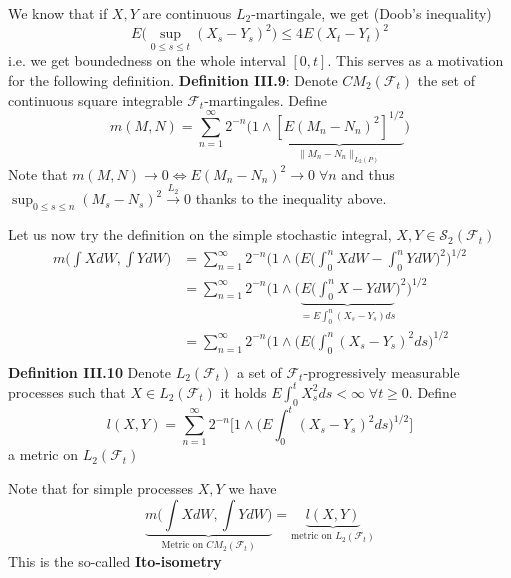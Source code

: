 \documentclass[english]{article}
\newcommand{\ub}{\underbrace}
\newcommand{\note}[1]{\noindent\textbf{#1}}
\newcommand{\F}{\mathcal F}
\begin{document}
We know that if $X,Y$ are continuous $L_2$-martingale, we get (Doob's inequality)
$$E\Big(\sup_{0\leq s \leq t} (X_s - Y_s)^2 \Big) \leq 4 E(X_t - Y_t)^2$$
i.e. we get boundedness on the whole interval $[0,t]$. This serves as a motivation for the following definition. \newline
\note{Definition III.9}: Denote $CM_2(\F_t)$ the set of continuous square integrable $\F_t$-martingales. Define
$$m(M, N) = \sum^{\infty}_{n=1} 2^{-n} \big(1 \wedge \ub{[E(M_n - N_n)^2]^{1/2}}_{\| M_n - N_n\|_{L_2(P)}} \big)$$
Note that $m(M,N) \to 0 \iff E(M_n - N_n)^2 \to 0 \; \forall n$ and thus $\sup_{0\leq s \leq n} (M_s - N_s)^2 \stackrel{L_2}\to 0$ thanks to the inequality above. \newline

Let us now try the definition on the simple stochastic integral, $X,Y \in \mathcal S_2(\F_t)$
\begin{align*}m\Big(\int X dW, \int Y dW \Big) &= \sum^\infty_{n=1} 2^{-n} ( 1 \wedge \Big(E\Big(\int^n_0 X dW - \int^n_0 Y dW\Big)^2\Big)^{1/2} \\
&= \sum^\infty_{n=1} 2^{-n} ( 1 \wedge \Big(\ub{E\Big(\int^n_0 X-  Y dW}_{=E\int^n_0 (X_s - Y_s) ds}\Big)^2\Big)^{1/2} \\
&= \sum^\infty_{n=1} 2^{-n} ( 1 \wedge \Big(E\Big(\int^n_0 (X_s - Y_s)^2 ds \Big)^{1/2} \\
\end{align*}
\note{Definition III.10} Denote $L_2(\F_t)$ a set of $\F_t$-progressively measurable processes such that $X\in L_2(\F_t)$ it holds $E\int^t_0 X_s^2 ds < \infty \; \forall t\geq 0$. \newline
Define 
$$l(X,Y) = \sum^{\infty}_{n=1} 2^{-n} \Big[ 1 \wedge \Big( E\int^t_0 (X_s - Y_s)^2 ds\Big)^{1/2} \Big]$$
a metric on $L_2(\F_t)$ \newline

Note that for simple processes $X,Y$ we have
$$\ub{m\Big(\int X dW, \int Y dW \Big)}_{\text{Metric on } CM_2(\F_t)} = \ub{l (X,Y)}_{\text{metric on }L_2(\F_t)}$$
This is the so-called \textbf{Ito-isometry}
\end{document}
